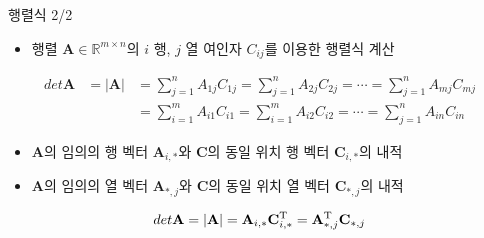 \begin{frame}{행렬식 2/2}

\begin{itemize}
\item 행렬 $\mathbf A \in \mathbb R^{m \times n}$의 $i$ 행, $j$ 열 여인자 $C_{ij}$를 이용한 행렬식 계산
\end{itemize}
\begin{eqnarray}
det \mathbf A &= | \mathbf A | &= \sum_{j=1}^n A_{1j} C_{1j} = \sum_{j=1}^n A_{2j} C_{2j} = \cdots = \sum_{j=1}^n A_{mj} C_{mj} \\ \nonumber
& &= \sum_{i=1}^m A_{i1} C_{i1} = \sum_{i=1}^m A_{i2} C_{i2} = \cdots = \sum_{j=1}^n A_{in} C_{in} 
\end{eqnarray}

\begin{itemize}
\item $\mathbf A$의 임의의 행 벡터 $\mathbf A_{i,*}$와 $\mathbf C$의 동일 위치 행 벡터 $\mathbf C_{i,*}$의 내적
\item $\mathbf A$의 임의의 열 벡터 $\mathbf A_{*,j}$와 $\mathbf C$의 동일 위치 열 벡터 $\mathbf C_{*,j}$의 내적
\end{itemize}

\begin{eqnarray}
det \mathbf A = | \mathbf A | = \mathbf A_{i,*} \mathbf C_{i,*}^{\rm T} = \mathbf A_{*,j}^{\rm T} \mathbf C_{*,j}
\end{eqnarray}

\end{frame}



